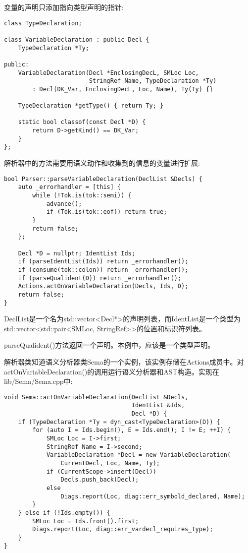 变量的声明只添加指向类型声明的指针:\par

\begin{lstlisting}[caption={}]
class TypeDeclaration;

class VariableDeclaration : public Decl {
	TypeDeclaration *Ty;
	
public:
	VariableDeclaration(Decl *EnclosingDecL, SMLoc Loc,
						StringRef Name, TypeDeclaration *Ty)
		: Decl(DK_Var, EnclosingDecL, Loc, Name), Ty(Ty) {}
	
	TypeDeclaration *getType() { return Ty; }
	
	static bool classof(const Decl *D) {
		return D->getKind() == DK_Var;
	}
};
\end{lstlisting}

解析器中的方法需要用语义动作和收集到的信息的变量进行扩展:\par

\begin{lstlisting}[caption={}]
bool Parser::parseVariableDeclaration(DeclList &Decls) {
	auto _errorhandler = [this] {
		while (!Tok.is(tok::semi)) {
			advance();
			if (Tok.is(tok::eof)) return true;
		}
		return false;
	};

	Decl *D = nullptr; IdentList Ids;
	if (parseIdentList(Ids)) return _errorhandler();
	if (consume(tok::colon)) return _errorhandler();
	if (parseQualident(D)) return _errorhandler();
	Actions.actOnVariableDeclaration(Decls, Ids, D);
	return false;
}
\end{lstlisting}

DeclList是一个名为std::vector<Decl*>的声明列表，而IdentList是一个类型为std::vector<std::pair<SMLoc, StringRef>>的位置和标识符列表。\par

parseQualident()方法返回一个声明。本例中，应该是一个类型声明。\par

解析器类知道语义分析器类Sema的一个实例，该实例存储在Actions成员中。对actOnVariableDeclaration()的调用运行语义分析器和AST构造。实现在lib/Sema/Sema.cpp中:\par

\begin{lstlisting}[caption={}]
void Sema::actOnVariableDeclaration(DeclList &Decls,
									IdentList &Ids,
									Decl *D) {
	if (TypeDeclaration *Ty = dyn_cast<TypeDeclaration>(D)) {
		for (auto I = Ids.begin(), E = Ids.end(); I != E; ++I) {
			SMLoc Loc = I->first;
			StringRef Name = I->second;
			VariableDeclaration *Decl = new VariableDeclaration(
				CurrentDecl, Loc, Name, Ty);
			if (CurrentScope->insert(Decl))
				Decls.push_back(Decl);
			else
				Diags.report(Loc, diag::err_symbold_declared, Name);
		}
	} else if (!Ids.empty()) {
		SMLoc Loc = Ids.front().first;
		Diags.report(Loc, diag::err_vardecl_requires_type);
	}
}
\end{lstlisting}


